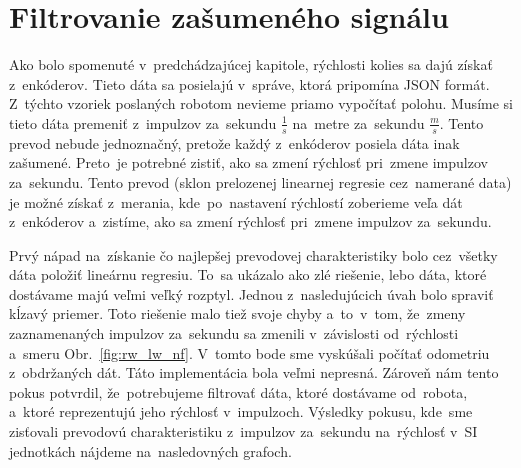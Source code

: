 
\section{Filtrovanie zašumeného signálu}
\label{sec:ziskavanieRychlosti}

Ako bolo spomenuté v~predchádzajúcej kapitole, rýchlosti kolies sa dajú získať z~enkóderov. Tieto dáta sa posielajú v~správe, ktorá pripomína JSON formát.
Z~týchto vzoriek poslaných robotom nevieme priamo vypočítať polohu. Musíme si tieto dáta premeniť z~impulzov za~sekundu \(\frac{1}{s}\) na~metre
za~sekundu \(\frac{m}{s}\). Tento prevod nebude jednoznačný, pretože každý z~enkóderov posiela dáta inak zašumené. Preto~je potrebné zistiť, ako sa zmení
rýchlosť pri~zmene impulzov za~sekundu. Tento prevod (sklon prelozenej linearnej regresie cez~namerané data) je možné získať z~merania, kde~po~nastavení
rýchlostí zoberieme veľa dát z~enkóderov a~zistíme, ako sa zmení rýchlosť pri~zmene impulzov za~sekundu.

Prvý nápad na~získanie čo najlepšej prevodovej charakteristiky bolo cez~všetky dáta položiť lineárnu regresiu. To~sa ukázalo ako zlé riešenie, lebo dáta,
ktoré dostávame majú veľmi veľký rozptyl. Jednou z~nasledujúcich úvah bolo spraviť kĺzavý priemer. Toto riešenie malo tiež svoje chyby a~to~v~tom, že~zmeny
zaznamenaných impulzov za~sekundu sa zmenili v~závislosti od~rýchlosti a~smeru Obr.~\ref{fig:rw_lw_nf}. V~tomto bode sme vyskúšali počítať odometriu
z~obdržaných dát. Táto implementácia bola veľmi nepresná. Zároveň nám tento pokus potvrdil, že~potrebujeme filtrovať dáta, ktoré dostávame
od~robota, a~ktoré reprezentujú jeho rýchlosť v~impulzoch. Výsledky pokusu, kde~sme zisťovali prevodovú charakteristiku z~impulzov za~sekundu na~rýchlosť
v~SI jednotkách nájdeme na~nasledovných grafoch.

